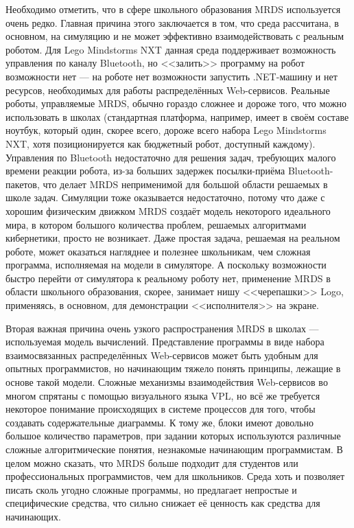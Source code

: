\documentclass[a4paper]{article}
\begin{document}
Необходимо отметить, что в сфере школьного образования MRDS используется очень редко. Главная причина этого заключается в том, что среда рассчитана, в основном, на симуляцию и не может эффективно взаимодействовать с реальным роботом. Для Lego Mindstorms NXT данная среда поддерживает возможность управления по каналу Bluetooth, но <<залить>> программу на робот возможности нет --- на роботе нет возможности запустить .NET-машину и нет ресурсов, необходимых для работы распределённых Web-сервисов. Реальные роботы, управляемые MRDS, обычно гораздо сложнее и дороже того, что можно использовать в школах (стандартная платформа, например, имеет в своём составе ноутбук, который один, скорее всего, дороже всего набора Lego Mindstorms NXT, хотя позиционируется как бюджетный робот, доступный каждому). Управления по Bluetooth недостаточно для решения задач, требующих малого времени реакции робота, из-за больших задержек посылки-приёма Bluetooth-пакетов, что делает MRDS неприменимой для большой области решаемых в школе задач. Симуляции тоже оказывается недостаточно, потому что даже с хорошим физическим движком MRDS создаёт модель некоторого идеального мира, в котором большого количества проблем, решаемых алгоритмами кибернетики, просто не возникает. Даже простая задача, решаемая на реальном роботе, может оказаться нагляднее и полезнее школьникам, чем сложная программа, исполняемая на модели в симуляторе. А поскольку возможности быстро перейти от симулятора к реальному роботу нет, применение MRDS в области школьного образования, скорее, занимает нишу <<черепашки>> Logo, применяясь, в основном, для демонстрации <<исполнителя>> на экране.

Вторая важная причина очень узкого распространения MRDS в школах --- используемая модель вычислений. Представление программы в виде набора взаимосвязанных распределённых Web-сервисов может быть удобным для опытных программистов, но начинающим тяжело понять принципы, лежащие в основе такой модели. Сложные механизмы взаимодействия Web-сервисов во многом спрятаны с помощью визуального языка VPL, но всё же требуется некоторое понимание происходящих в системе процессов для того, чтобы создавать содержательные диаграммы. К тому же, блоки имеют довольно большое количество параметров, при задании которых используются различные сложные алгоритмические понятия, незнакомые начинающим программистам. В целом можно сказать, что MRDS больше подходит для студентов или профессиональных программистов, чем для школьников. Среда хоть и позволяет писать сколь угодно сложные программы, но предлагает непростые и специфические средства, что сильно снижает её ценность как средства для начинающих.
\end{document}
